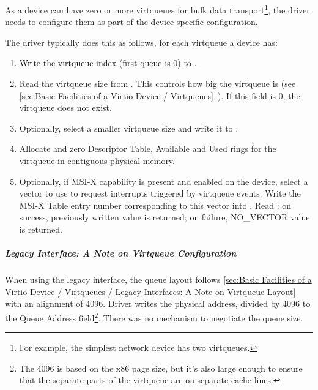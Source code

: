 As a device can have zero or more virtqueues for bulk data
transport\footnote{For example, the simplest network device has two virtqueues.}, the driver
needs to configure them as part of the device-specific
configuration.

The driver typically does this as follows, for each virtqueue a device has:

\begin{enumerate}
\item Write the virtqueue index (first queue is 0) to .

\item Read the virtqueue size from . This controls how big the virtqueue is
  (see \ref{sec:Basic Facilities of a Virtio Device / Virtqueues}~). If this field is 0, the virtqueue does not exist.

\item Optionally, select a smaller virtqueue size and write it to .

\item Allocate and zero Descriptor Table, Available and Used rings for the
   virtqueue in contiguous physical memory.

\item Optionally, if MSI-X capability is present and enabled on the
  device, select a vector to use to request interrupts triggered
  by virtqueue events. Write the MSI-X Table entry number
  corresponding to this vector into . Read
  : on success, previously written value is
  returned; on failure, NO_VECTOR value is returned.
\end{enumerate}

\subparagraph{Legacy Interface: A Note on Virtqueue Configuration}\label{sec:Virtio Transport Options / Virtio Over PCI Bus / PCI-specific Initialization And Device Operation / Device Initialization / Virtqueue Configuration / Legacy Interface: A Note on Virtqueue Configuration}
When using the legacy interface, the queue layout follows \ref{sec:Basic Facilities of a Virtio Device / Virtqueues / Legacy Interfaces: A Note on Virtqueue Layout}~ with an alignment of 4096.
Driver writes the physical address, divided
by 4096 to the Queue Address field\footnote{The 4096 is based on the x86 page size, but it's also large
enough to ensure that the separate parts of the virtqueue are on
separate cache lines.
}.  There was no mechanism to negotiate the queue size.

